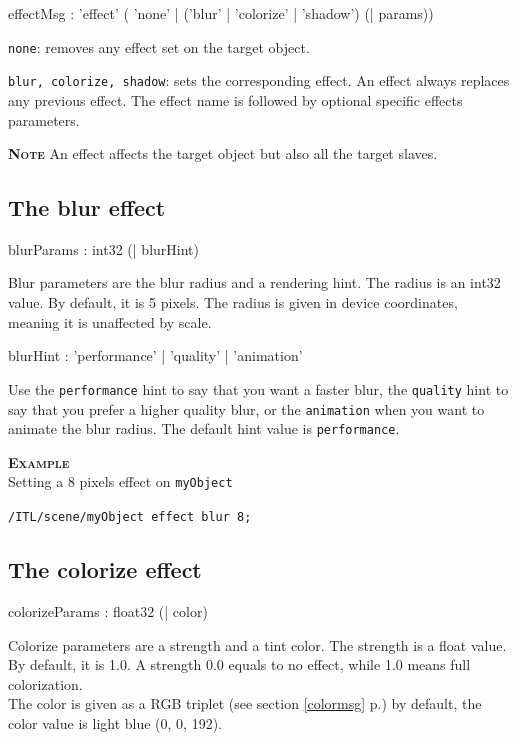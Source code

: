 \documentclass[a4paper,twoside]{report}
\newcommand{\subsublevel}[1]	{\subsection{#1}}
\newcommand{\fullref}[1]	{\ref{#1} p.\pageref{#1}}
\newcommand{\OSC}[1]		{\texttt{#1}}
\newcommand{\example}		{\textbf{\hspace{-1.5cm}\textbf{\textsc{Example }}}}
\newcommand{\note}	[1]		{\vspace{2mm}\textbf{\hspace{-1.03cm}\textbf{\textsc{Note #1}}}}
\let\olditemize\itemize
\let\oldenditemize\enditemize
\renewenvironment{itemize} 	{\olditemize \setlength{\itemsep}{1mm}}{\oldenditemize}
\newcommand{\sample}	[1]			{\vspace{-2mm}\begin{center}\colorbox{mygrey}{
								\begin{minipage}[t]{0.9\columnwidth} 
								{\small \texttt{#1}}
								\end{minipage}}\end{center}}
\begin{document}
\begin{rail}
effectMsg : 'effect' ( 'none'
		| ('blur'
		| 'colorize'
		| 'shadow') (| params)) 		
\end{rail}

\begin{itemize}
\item \OSC{none}: removes any effect set on the target object.
\item \OSC{blur, colorize, shadow}: sets the corresponding effect. An effect always replaces any previous effect. The effect name is followed by optional specific effects parameters.
\end{itemize}

\note{} An effect affects the target object but also all the target slaves.

\subsublevel{The blur effect}

\begin{rail}
blurParams : int32 (| blurHint)
\end{rail}

Blur parameters are the blur radius and a rendering hint. The radius is an int32 value. By default, it is 5 pixels. The radius is given in device coordinates, meaning it is unaffected by scale. 

\begin{rail}
blurHint : 'performance' | 'quality' | 'animation'
\end{rail}
Use the \OSC{performance} hint to say that you want a faster blur, the \OSC{quality} hint to say that you prefer a higher quality blur, or the \OSC{animation} when you want to animate the blur radius. The default hint value is \OSC{performance}.

\example \\
Setting a 8 pixels effect on \OSC{myObject}
\sample{/ITL/scene/myObject effect blur 8;}

\subsublevel{The colorize effect}

\begin{rail}
colorizeParams : float32 (| color)
\end{rail}

Colorize parameters are a strength and a tint color. The strength is a float value. By default, it is 1.0. A strength 0.0 equals to no effect, while 1.0 means full colorization. \\
The color is given as a RGB triplet (see section \fullref{colormsg}) by default, the color value is light blue (0, 0, 192).
\end{document}
